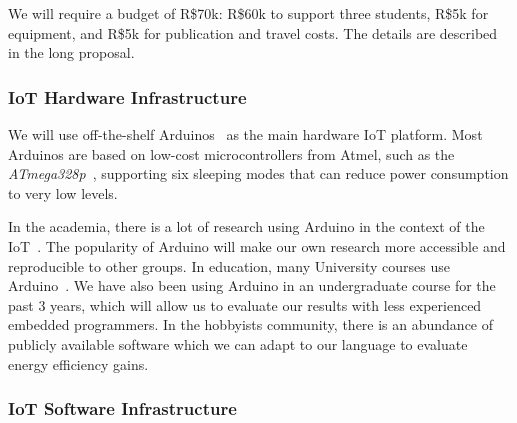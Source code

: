 \documentclass[12pt,english]{amsart}
\begin{document}
We will require a budget of R\$70k:
R\$60k to support three students, R\$5k for equipment, and
R\$5k for publication and travel costs.
The details are described in the long proposal.

\subsubsection{IoT Hardware Infrastructure}

%
We will use off-the-shelf Arduinos~\cite{arduino} as the main hardware IoT
platform.
Most Arduinos are based on low-cost microcontrollers from
Atmel, such as the \emph{ATmega328p}~\cite{arduino.atmega328p}, supporting
six sleeping modes that can reduce power consumption to very low levels.

%
    In the academia, there is a lot of research using Arduino in the context of
    the IoT~\cite{arduino.infra,arduino.health,arduino.home,arduino.energy}.
    The popularity of
    Arduino will make our own research more accessible and reproducible to
    other groups.
%
    In education, many University courses use Arduino~\cite{arduino.edu.1,arduino.edu.2,arduino.edu.3,arduino.edu.4}.
    We have also been using Arduino in an undergraduate course for the
    past 3 years,
    which will allow us to evaluate
    our results with less experienced embedded programmers.
%
    In the hobbyists community, there is an abundance of publicly available software
    which we can adapt to our
    language to evaluate energy efficiency gains.
%

\subsubsection{IoT Software Infrastructure}
\label{sec.method.software}
\end{document}
